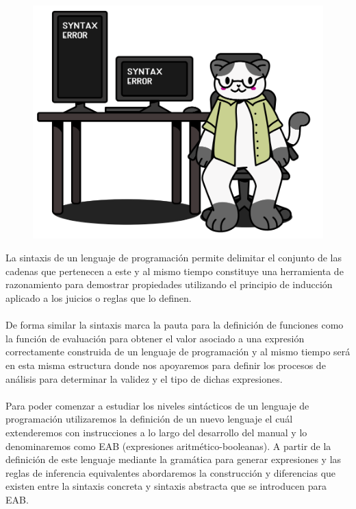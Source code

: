 
\begin{figure}[htbp]
    \centerline{\includegraphics[scale=.38]{assets/03_gatito_sintaxis.PNG}}       
\end{figure}


La sintaxis de un lenguaje de programación permite delimitar el conjunto de las cadenas que pertenecen a este y al mismo tiempo constituye una herramienta de razonamiento para demostrar propiedades utilizando el principio de inducción aplicado a los juicios o reglas que lo definen. \\\\
De forma similar la sintaxis marca la pauta para la definición de funciones como la función de evaluación para obtener el valor asociado a una expresión correctamente construida de un lenguaje de programación y al mismo tiempo será en esta misma estructura donde nos apoyaremos para definir los procesos de análisis para determinar la validez y el tipo de dichas expresiones.\\\\
Para poder comenzar a estudiar los niveles sintácticos de un lenguaje de programación utilizaremos la definición de un nuevo lenguaje el cuál extenderemos con instrucciones a lo largo del desarrollo del manual y lo denominaremos como \textsf{EAB} (expresiones aritmético-booleanas). A partir de la definición de este lenguaje mediante la gramática para generar expresiones y las reglas de inferencia equivalentes abordaremos la construcción y diferencias que existen entre la sintaxis concreta y sintaxis abstracta que se introducen para \textsf{EAB}.\\

